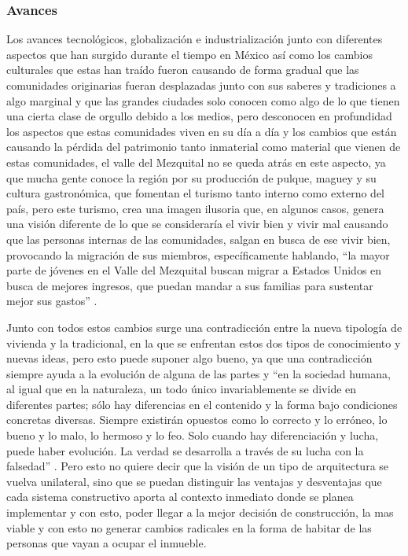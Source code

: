 \subsubsection{Avances}
Los avances tecnológicos, globalización e industrialización junto con diferentes aspectos que han surgido durante el tiempo en México así como los cambios culturales que estas han traído fueron causando de forma gradual que las comunidades originarias fueran desplazadas junto con sus saberes y tradiciones a algo marginal y que las grandes ciudades solo conocen como algo de lo que tienen una cierta clase de orgullo debido a los medios, pero desconocen en profundidad los aspectos que estas comunidades viven en su día a día y los cambios que están causando la pérdida del patrimonio tanto inmaterial como material que vienen de estas comunidades, el valle del Mezquital no se queda atrás en este aspecto, ya que mucha gente conoce la región por su producción de pulque, maguey y su cultura gastronómica, que fomentan el turismo tanto interno como externo del país, pero este turismo, crea una imagen ilusoria que, en algunos casos, genera una visión diferente de lo que se consideraría el vivir bien y vivir mal causando que las personas internas de las comunidades, salgan en busca de ese vivir bien, provocando la migración de sus miembros, específicamente hablando, ``la mayor parte de jóvenes en el Valle del Mezquital buscan migrar a Estados Unidos en busca de mejores ingresos, que puedan mandar a sus familias para sustentar mejor sus gastos'' \citep{baez2012pueblos}.

Junto con todos estos cambios surge una contradicción entre la nueva tipología de vivienda y la tradicional, en la que se enfrentan estos dos tipos de conocimiento y nuevas ideas, pero esto puede suponer algo bueno, ya que una contradicción siempre ayuda a la evolución de alguna de las partes y ``en la sociedad humana, al igual que en la naturaleza, un todo único invariablemente se divide en diferentes partes; sólo hay diferencias en el contenido y la forma bajo condiciones concretas diversas. Siempre existirán opuestos como lo correcto y lo erróneo, lo bueno y lo malo, lo hermoso y lo feo. Solo cuando hay diferenciación y lucha, puede haber evolución. La verdad se desarrolla a través de su lucha con la falsedad'' \citep{mao1974cinco}. Pero esto no quiere decir que la visión de un tipo de arquitectura se vuelva unilateral, sino que se puedan distinguir las ventajas y desventajas que  cada sistema constructivo aporta al contexto inmediato donde se planea implementar y con esto, poder llegar a la mejor decisión de construcción, la mas viable y con esto no generar cambios radicales en la forma de habitar de las personas que vayan a ocupar el inmueble.

